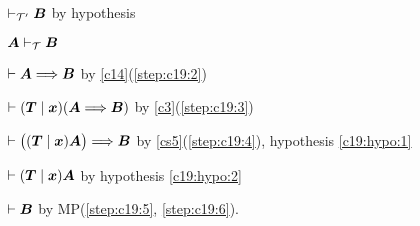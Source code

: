 \begin{pf}
\item\label{step:c19:1} $\vdash_{\mathcal{T}'}\boldsymbol{B}$ by hypothesis
\item\label{step:c19:2} $\boldsymbol{A}\vdash_{\mathcal{T}}\boldsymbol{B}$
\item\label{step:c19:3} $\vdash\boldsymbol{A}\Longrightarrow\boldsymbol{B}$
by \ref{c14}(\ref{step:c19:2})
\item\label{step:c19:4} $\vdash(\boldsymbol{T}\mid\boldsymbol{x})(\boldsymbol{A}\Longrightarrow\boldsymbol{B})$
by \ref{c3}(\ref{step:c19:3})
\item\label{step:c19:5} $\vdash\bigl((\boldsymbol{T}\mid\boldsymbol{x})\boldsymbol{A}\bigr)\Longrightarrow\boldsymbol{B}$
by \ref{cs5}(\ref{step:c19:4}), hypothesis \ref{c19:hypo:1}
\item\label{step:c19:6} $\vdash(\boldsymbol{T}\mid\boldsymbol{x})\boldsymbol{A}$
by hypothesis \ref{c19:hypo:2}
\item\label{step:c19:7} $\vdash\boldsymbol{B}$ by MP(\ref{step:c19:5}, \ref{step:c19:6}).
\end{pf}
